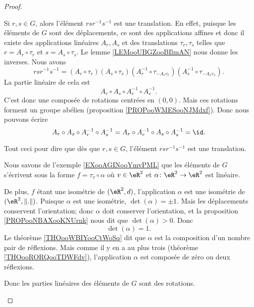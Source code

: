 \begin{proof}
\begin{subproof}
		\spitem[Translation]
		Si \( r,s\in G\), alors l'élément \( rsr^{-1}s^{-1}\) est une translation. En effet, puisque les éléments de \( G\) sont des déplacements, ce sont des applications affines et donc il existe des applications linéaires \( A_r,A_s\) et des translations \( \tau_r,\tau_s\) telles que \( r=A_r\circ \tau_r\) et \( s=A_s\circ \tau_s\). Le lemme \ref{LEMooUBGZooBIlmAN} nous donne les inverses. Nous avons
		\begin{equation}
			rsr^{-1}s^{-1}=(A_r\circ \tau_r)(A_s\circ \tau_s)(A_r^{-1}\circ \tau_{-A_rv_r})(A_s^{-1}\circ \tau_{-A_sv_s}).
		\end{equation}
		La partie linéaire de cela est
		\begin{equation}
			A_r\circ A_s\circ A_r^{-1}\circ A_s^{-1}.
		\end{equation}
		C'est donc une composée de rotations centrées en \( (0,0)\). Mais ces rotations forment un groupe abélien (proposition \ref{PROPooWMESooNJMdxf}). Donc nous pouvons écrire
		\begin{equation}
			A_r\circ A_s\circ A_r^{-1}\circ A_s^{-1}=A_r\circ A_r^{-1}\circ A_s\circ A_s^{-1}=\id.
		\end{equation}

		Tout ceci pour dire que dès que \( r,s\in G\), l'élément \( rsr^{-1} s^{-1}\) est une translation.

		Nous savons de l'exemple \ref{EXooAGINooYmvPML} que les éléments de \( G\) s'écrivent sous la forme \( f=\tau_v\circ \alpha\) où \( v\in \eR^2\) et \( \alpha\colon \eR^2\to \eR^2\) est linéaire.

		De plus, \( f\) étant une isométrie de \( (\eR^2,d)\), l'application \( \alpha\) est une isométrie de \( (\eR^2,\| . \|)\). Puisque \( \alpha\) est une isométrie, \( \det(\alpha)=\pm1\). Mais les déplacements conservent l'orientation; donc \( \alpha\) doit conserver l'orientation, et la proposition \ref{PROPooNBAXooKNUrnk} nous dit que \( \det(\alpha)>0\). Donc
		\begin{equation}
			\det(\alpha)=1.
		\end{equation}
		Le théorème \ref{THOooWBIYooCtWoSq} dit que \( \alpha\) est la composition d'un nombre pair de réflexions. Mais comme il y en a au plus trois (théorème \ref{THOooRORQooTDWFdv}), l'application \( \alpha\) est composée de zéro ou deux réflexions.

		Donc les parties linéaires des éléments de \( G\) sont des rotations.


\end{subproof}
\end{proof}
